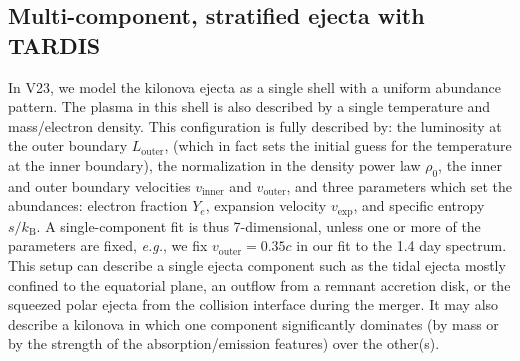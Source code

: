 \documentclass[twocolumn, twocolappendix]{aastex63}
\def\eg{{\it e.g.}}
\begin{document}
\subsection{Multi-component, stratified ejecta with \textsc{TARDIS}}\label{ssc:multi-component-TARDIS}




In V23, we model the kilonova ejecta as a single shell with a uniform abundance pattern. The plasma in this shell is also described by a single temperature and mass/electron density. This configuration is fully described by: the luminosity at the outer boundary $L_{\mathrm{outer}}$, (which in fact sets the initial guess for the temperature at the inner boundary), the normalization in the density power law $\rho_0$, the inner and outer boundary velocities $v_{\mathrm{inner}}$ and $v_{\mathrm{outer}}$, and three parameters which set the abundances: electron fraction $Y_e$, expansion velocity $v_{\mathrm{exp}}$, and specific entropy $s / k_{\mathrm{B}}$. A single-component fit is thus 7-dimensional, unless one or more of the parameters are fixed, \eg, we fix $v_{\mathrm{outer}} = 0.35c$ in our fit to the 1.4 day spectrum. This setup can describe a single ejecta component such as the tidal ejecta mostly confined to the equatorial plane, an outflow from a remnant accretion disk, or the squeezed polar ejecta from the collision interface during the merger. It may also describe a kilonova in which one component significantly dominates (by mass or by the strength of the absorption/emission features) over the other(s). 
    
\end{document}
